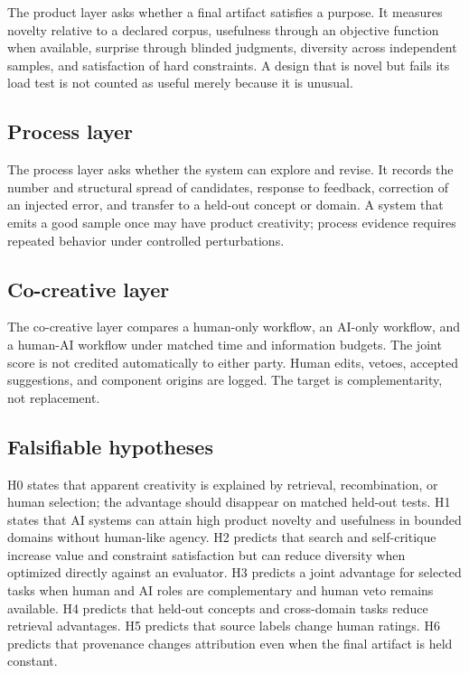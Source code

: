 \documentclass[conference]{IEEEtran}
\begin{document}
The product layer asks whether a final artifact satisfies a purpose. It measures
novelty relative to a declared corpus, usefulness through an objective function when
available, surprise through blinded judgments, diversity across independent samples,
and satisfaction of hard constraints. A design that is novel but fails its load test is
not counted as useful merely because it is unusual.

\subsection{Process layer}

The process layer asks whether the system can explore and revise. It records the number
and structural spread of candidates, response to feedback, correction of an injected
error, and transfer to a held-out concept or domain. A system that emits a good sample
once may have product creativity; process evidence requires repeated behavior under
controlled perturbations.

\subsection{Co-creative layer}

The co-creative layer compares a human-only workflow, an AI-only workflow, and a
human-AI workflow under matched time and information budgets. The joint score is not
credited automatically to either party. Human edits, vetoes, accepted suggestions,
and component origins are logged. The target is complementarity, not replacement.

\subsection{Falsifiable hypotheses}

H0 states that apparent creativity is explained by retrieval, recombination, or human
selection; the advantage should disappear on matched held-out tests. H1 states that AI
systems can attain high product novelty and usefulness in bounded domains without
human-like agency. H2 predicts that search and self-critique increase value and
constraint satisfaction but can reduce diversity when optimized directly against an
evaluator. H3 predicts a joint advantage for selected tasks when human and AI roles are
complementary and human veto remains available. H4 predicts that held-out concepts and
cross-domain tasks reduce retrieval advantages. H5 predicts that source labels change
human ratings. H6 predicts that provenance changes attribution even when the final
artifact is held constant.
\end{document}
